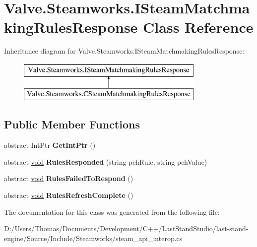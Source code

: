 \hypertarget{classValve_1_1Steamworks_1_1ISteamMatchmakingRulesResponse}{}\section{Valve.\+Steamworks.\+I\+Steam\+Matchmaking\+Rules\+Response Class Reference}
\label{classValve_1_1Steamworks_1_1ISteamMatchmakingRulesResponse}
Inheritance diagram for Valve.\+Steamworks.\+I\+Steam\+Matchmaking\+Rules\+Response\+:\begin{figure}[H]
\begin{center}
\leavevmode
\includegraphics[height=2.000000cm]{classValve_1_1Steamworks_1_1ISteamMatchmakingRulesResponse}
\end{center}
\end{figure}
\subsection*{Public Member Functions}
\begin{DoxyCompactItemize}
\item 
\hypertarget{classValve_1_1Steamworks_1_1ISteamMatchmakingRulesResponse_acba4ded25ad958a41815e0a45b6d8272}{}abstract Int\+Ptr {\bfseries Get\+Int\+Ptr} ()\label{classValve_1_1Steamworks_1_1ISteamMatchmakingRulesResponse_acba4ded25ad958a41815e0a45b6d8272}

\item 
\hypertarget{classValve_1_1Steamworks_1_1ISteamMatchmakingRulesResponse_a9a30d58df8e15d3b99302e355d2f30aa}{}abstract \hyperlink{SDL__audio_8h_a52835ae37c4bb905b903cbaf5d04b05f}{void} {\bfseries Rules\+Responded} (string pch\+Rule, string pch\+Value)\label{classValve_1_1Steamworks_1_1ISteamMatchmakingRulesResponse_a9a30d58df8e15d3b99302e355d2f30aa}

\item 
\hypertarget{classValve_1_1Steamworks_1_1ISteamMatchmakingRulesResponse_a26d8bc957eed9ac2a3f4de9a4e6fbaa4}{}abstract \hyperlink{SDL__audio_8h_a52835ae37c4bb905b903cbaf5d04b05f}{void} {\bfseries Rules\+Failed\+To\+Respond} ()\label{classValve_1_1Steamworks_1_1ISteamMatchmakingRulesResponse_a26d8bc957eed9ac2a3f4de9a4e6fbaa4}

\item 
\hypertarget{classValve_1_1Steamworks_1_1ISteamMatchmakingRulesResponse_a2eeba025de9764bc39b8854e175b0aff}{}abstract \hyperlink{SDL__audio_8h_a52835ae37c4bb905b903cbaf5d04b05f}{void} {\bfseries Rules\+Refresh\+Complete} ()\label{classValve_1_1Steamworks_1_1ISteamMatchmakingRulesResponse_a2eeba025de9764bc39b8854e175b0aff}

\end{DoxyCompactItemize}


The documentation for this class was generated from the following file\+:\begin{DoxyCompactItemize}
\item 
D\+:/\+Users/\+Thomas/\+Documents/\+Development/\+C++/\+Last\+Stand\+Studio/last-\/stand-\/engine/\+Source/\+Include/\+Steamworks/steam\+\_\+api\+\_\+interop.\+cs\end{DoxyCompactItemize}
